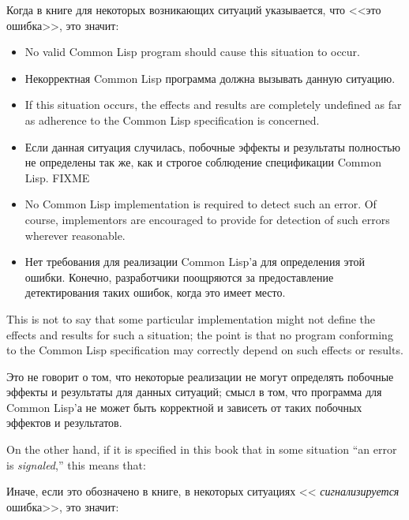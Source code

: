 Когда в книге для некоторых возникающих ситуаций указывается, что <<это
ошибка>>, это значит: 
\begin{itemize}
\item No valid Common Lisp program should cause this situation to occur.

\item Некорректная Common Lisp программа должна вызывать данную ситуацию.

\item If this situation occurs, the effects and results are completely
undefined as far as adherence to the Common Lisp specification is concerned.

\item Если данная ситуация случилась, побочные эффекты и результаты полностью не
определены так же, как и строгое соблюдение спецификации Common Lisp. FIXME

\item No Common Lisp implementation is required to detect such an error.
Of course, implementors are encouraged to provide for detection
of such errors wherever reasonable.

\item Нет требования для реализации Common Lisp'а для определения этой
ошибки. Конечно, разработчики поощряются за предоставление детектирования таких
ошибок, когда это имеет место.
\end{itemize}
This is not to say that some particular implementation might not define
the effects and results for such a situation; the point is that no program
conforming to the Common Lisp specification may correctly depend on such
effects or results.

Это не говорит о том, что некоторые реализации не могут определять
побочные эффекты и результаты для данных ситуаций; смысл в том, что программа для
Common Lisp'а не может быть корректной и зависеть от таких побочных эффектов и результатов.

On the other hand, if it is specified in this book that in some situation
``an error is {\it signaled},'' this means that:

Иначе, если это обозначено в книге, в некоторых ситуациях <<{\it
сигнализируется} ошибка>>, это значит:

